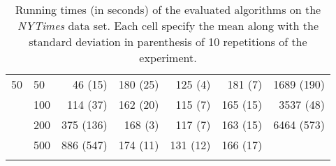 \begin{longtable}{llrrrrr}
 \midrule
50 & 50  &     46 (15) &       180 (25) &   125 (4) &              181 (7) &  1689 (190) \\
   & 100 &    114 (37) &       162 (20) &   115 (7) &             165 (15) &   3537 (48) \\
   & 200 &   375 (136) &        168 (3) &   117 (7) &             163 (15) &  6464 (573) \\
   & 500 &   886 (547) &       174 (11) &  131 (12) &             166 (17) &          \\
\bottomrule
\caption{Running times (in seconds) of the evaluated algorithms on the \textit{NYTimes} data set. Each cell specify the mean along with the standard deviation in parenthesis of 10 repetitions of the experiment.}
\label{tab:running-time-mean-nytimes}
\end{longtable}

